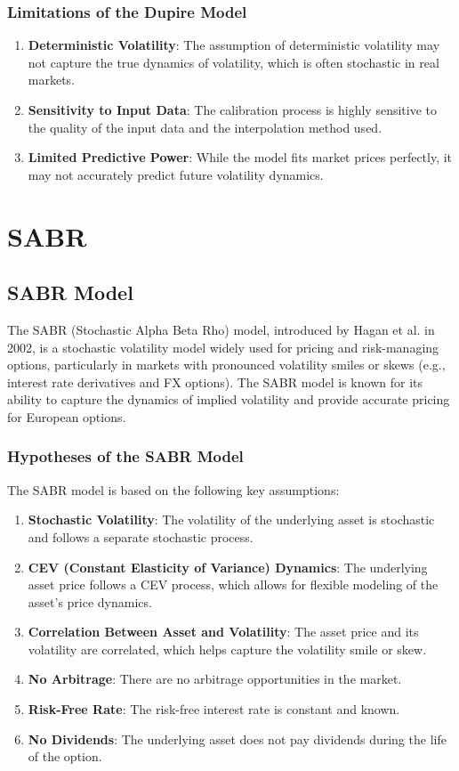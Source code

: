\documentclass[11pt, oneside, a4paper, titlepage]{report}
\begin{document}
\subsubsection{Limitations of the Dupire Model}
\begin{enumerate}
    \item \textbf{Deterministic Volatility}: The assumption of deterministic volatility may not capture the true dynamics of volatility, which is often stochastic in real markets.
    \item \textbf{Sensitivity to Input Data}: The calibration process is highly sensitive to the quality of the input data and the interpolation method used.
    \item \textbf{Limited Predictive Power}: While the model fits market prices perfectly, it may not accurately predict future volatility dynamics.
\end{enumerate}

\section{SABR}
\subsection{SABR Model}

The SABR (Stochastic Alpha Beta Rho) model, introduced by Hagan et al. in 2002, is a stochastic volatility model widely used for pricing and risk-managing options, particularly in markets with pronounced volatility smiles or skews (e.g., interest rate derivatives and FX options). The SABR model is known for its ability to capture the dynamics of implied volatility and provide accurate pricing for European options.

\subsubsection{Hypotheses of the SABR Model}

The SABR model is based on the following key assumptions:
\begin{enumerate}
    \item \textbf{Stochastic Volatility}: The volatility of the underlying asset is stochastic and follows a separate stochastic process.
    \item \textbf{CEV (Constant Elasticity of Variance) Dynamics}: The underlying asset price follows a CEV process, which allows for flexible modeling of the asset's price dynamics.
    \item \textbf{Correlation Between Asset and Volatility}: The asset price and its volatility are correlated, which helps capture the volatility smile or skew.
    \item \textbf{No Arbitrage}: There are no arbitrage opportunities in the market.
    \item \textbf{Risk-Free Rate}: The risk-free interest rate is constant and known.
    \item \textbf{No Dividends}: The underlying asset does not pay dividends during the life of the option.
\end{enumerate}
\end{document}
